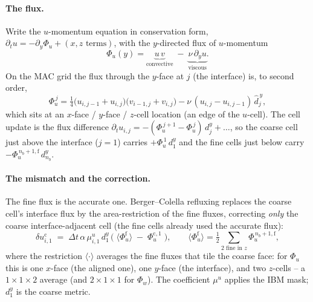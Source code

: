 \documentclass[11pt]{article}
\newcommand{\fine}{\mathrm{f}}
\newcommand{\coarse}{\mathrm{c}}
\begin{document}
\paragraph{The flux.} Write the $u$-momentum equation in conservation form,
$\partial_t u = -\partial_y \Phi_u + (\text{$x,z$ terms})$, with the
$y$-directed flux of $u$-momentum
\begin{equation}
  \Phi_u(y) = \underbrace{u\,v}_{\text{convective}} \;-\; \underbrace{\nu\,\partial_y u}_{\text{viscous}} .
  \label{eq:flux}
\end{equation}
On the MAC grid the flux through the $y$-face at $j$ (the interface) is, to
second order,
\begin{equation}
  \Phi_u^{\,j} = \tfrac14\big(u_{i,j-1}+u_{i,j}\big)\big(v_{i-1,j}+v_{i,j}\big)
              - \nu\,(u_{i,j}-u_{i,j-1})\,\hat d^{\,y}_j ,
  \label{eq:fluxdisc}
\end{equation}
which sits at an $x$-face / $y$-face / $z$-cell location (an edge of the
$u$-cell). The cell update is the flux difference
$\partial_t u_{i,j}=-(\Phi_u^{\,j+1}-\Phi_u^{\,j})\,d^y_j+\dots$, so the coarse
cell just above the interface ($j=1$) carries $+\Phi_u^{\,1}\,d^y_1$ and the
fine cells just below carry $-\Phi_u^{\,n_b+1,\fine}\,d^y_{n_b}$.

\paragraph{The mismatch and the correction.} The fine flux is the accurate
one. Berger--Colella refluxing replaces the coarse cell's interface flux by
the area-restriction of the fine fluxes, correcting \emph{only} the coarse
interface-adjacent cell (the fine cells already used the accurate flux):
\begin{equation}
  \delta u^\coarse_{i,1} \;=\; \Delta t\,\alpha\,\mu^u_{i,1}\,d^y_1\,
   \Big(\;\langle \Phi_u^{\fine}\rangle \;-\; \Phi_u^{\coarse,1}\;\Big),
  \qquad
  \langle\Phi_u^{\fine}\rangle=\tfrac{1}{2}\!\!\sum_{\text{2 fine in }z} \Phi_u^{\,n_b+1,\fine},
  \label{eq:reflux}
\end{equation}
where the restriction $\langle\cdot\rangle$ averages the fine fluxes that tile
the coarse face: for $\Phi_u$ this is one $x$-face (the aligned one), one
$y$-face (the interface), and two $z$-cells -- a $1{\times}1{\times}2$ average
(and $2{\times}1{\times}1$ for $\Phi_w$). The coefficient
$\mu^u$ applies the IBM mask; $d^y_1$ is the coarse metric.
\end{document}
